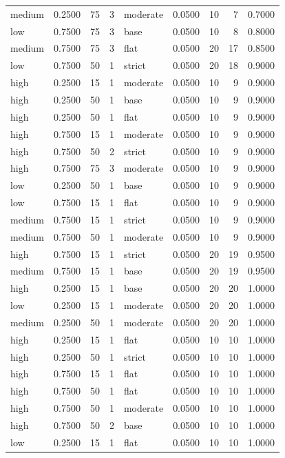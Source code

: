 \begin{tabular}{lrrrlrrrr}
medium & 0.2500 & 75 & 3 & moderate & 0.0500 & 10 & 7 & 0.7000 \\
low & 0.7500 & 75 & 3 & base & 0.0500 & 10 & 8 & 0.8000 \\
medium & 0.7500 & 75 & 3 & flat & 0.0500 & 20 & 17 & 0.8500 \\
low & 0.7500 & 50 & 1 & strict & 0.0500 & 20 & 18 & 0.9000 \\
high & 0.2500 & 15 & 1 & moderate & 0.0500 & 10 & 9 & 0.9000 \\
high & 0.2500 & 50 & 1 & base & 0.0500 & 10 & 9 & 0.9000 \\
high & 0.2500 & 50 & 1 & flat & 0.0500 & 10 & 9 & 0.9000 \\
high & 0.7500 & 15 & 1 & moderate & 0.0500 & 10 & 9 & 0.9000 \\
high & 0.7500 & 50 & 2 & strict & 0.0500 & 10 & 9 & 0.9000 \\
high & 0.7500 & 75 & 3 & moderate & 0.0500 & 10 & 9 & 0.9000 \\
low & 0.2500 & 50 & 1 & base & 0.0500 & 10 & 9 & 0.9000 \\
low & 0.7500 & 15 & 1 & flat & 0.0500 & 10 & 9 & 0.9000 \\
medium & 0.7500 & 15 & 1 & strict & 0.0500 & 10 & 9 & 0.9000 \\
medium & 0.7500 & 50 & 1 & moderate & 0.0500 & 10 & 9 & 0.9000 \\
high & 0.7500 & 15 & 1 & strict & 0.0500 & 20 & 19 & 0.9500 \\
medium & 0.7500 & 15 & 1 & base & 0.0500 & 20 & 19 & 0.9500 \\
high & 0.2500 & 15 & 1 & base & 0.0500 & 20 & 20 & 1.0000 \\
low & 0.2500 & 15 & 1 & moderate & 0.0500 & 20 & 20 & 1.0000 \\
medium & 0.2500 & 50 & 1 & moderate & 0.0500 & 20 & 20 & 1.0000 \\
high & 0.2500 & 15 & 1 & flat & 0.0500 & 10 & 10 & 1.0000 \\
high & 0.2500 & 50 & 1 & strict & 0.0500 & 10 & 10 & 1.0000 \\
high & 0.7500 & 15 & 1 & flat & 0.0500 & 10 & 10 & 1.0000 \\
high & 0.7500 & 50 & 1 & flat & 0.0500 & 10 & 10 & 1.0000 \\
high & 0.7500 & 50 & 1 & moderate & 0.0500 & 10 & 10 & 1.0000 \\
high & 0.7500 & 50 & 2 & base & 0.0500 & 10 & 10 & 1.0000 \\
low & 0.2500 & 15 & 1 & flat & 0.0500 & 10 & 10 & 1.0000 \\

\end{tabular}
